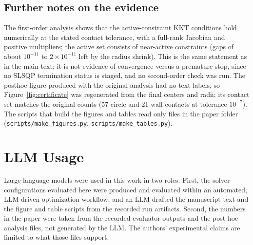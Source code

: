 \documentclass{article} %
\begin{document}
\begin{table}[h]
\centering
\caption{Contact analysis versus tolerance. ``Circle'' and ``Wall'' count active circle--circle and wall constraints; ``Low-degree'' counts circles with fewer than three contacts.}
\label{tab:tol}
\footnotesize
\setlength{\tabcolsep}{4pt}

\end{table}

\subsection{Further notes on the evidence}
The first-order analysis shows that the active-constraint KKT conditions hold numerically at the stated contact tolerance, with a full-rank Jacobian and positive multipliers; the active set consists of near-active constraints (gaps of about $10^{-11}$ to $2\times10^{-11}$ left by the radius shrink). This is the same statement as in the main text; it is not evidence of convergence versus a premature stop, since no SLSQP termination status is staged, and no second-order check was run. The posthoc figure produced with the original analysis had no text labels, so Figure~\ref{fig:certificate} was regenerated from the final centers and radii; its contact set matches the original counts (57 circle and 21 wall contacts at tolerance $10^{-7}$). The scripts that build the figures and tables read only files in the paper folder (\texttt{scripts/make\_figures.py}, \texttt{scripts/make\_tables.py}).

\section{LLM Usage}
Large language models were used in this work in two roles. First, the solver configurations evaluated here were produced and evaluated within an automated, LLM-driven optimization workflow, and an LLM drafted the manuscript text and the figure and table scripts from the recorded run artifacts. Second, the numbers in the paper were taken from the recorded evaluator outputs and the post-hoc analysis files, not generated by the LLM. The authors' experimental claims are limited to what those files support.
\end{document}
